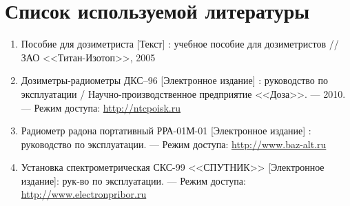 \documentclass[14pt,pscyr,titlepage]{hedreport}
\begin{document}
	\pagebreak

	\section{Список используемой литературы}
	\begin{enumerate}\itemsep-2pt
		\item Пособие для дозиметриста [Текст] : учебное пособие для 
			дозиметристов // ЗАО <<Титан-Изотоп>>, 2005
		\item Дозиметры-радиометры ДКС–96 [Электронное издание] : руководство 
			по эксплуатации / Научно-производственное предприятие 
			<<Доза>>. --- 2010. --- Режим доступа: 
        	\href{http://ntcpoisk.ru/d/350762/d/dozimetri_radiometridks96.pdf}
        		{http://ntcpoisk.ru}  
        \item Радиометр радона портативный РРА-01М-01 [Электронное издание] : 
        	руководство по эксплуатации. --- Режим доступа:
        	\href{http://www.baz-alt.ru/userfiles/files/sks.pdf}
        		{http://www.baz-alt.ru}  
        \item Установка спектрометрическая СКС-99 <<СПУТНИК>> 
			[Электронное издание]: рук-во по эксплуатации. --- Режим доступа: \\
			\href{http://www.electronpribor.ru/resources/docs/RE_PPA_01_01ispr.pdf}
				{http://www.electronpribor.ru}
	\end{enumerate}
\end{document}

